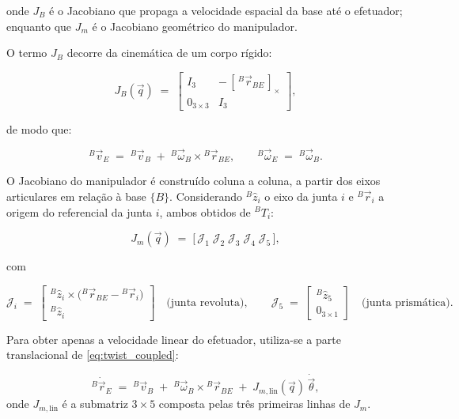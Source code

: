 onde $J_B$ é o Jacobiano que propaga a velocidade espacial da base até o efetuador; enquanto que $J_m$ é o Jacobiano geométrico do manipulador.

O termo $J_B$ decorre da cinemática de um corpo rígido:

\begin{equation}
\label{eq:JB}
J_B(\vec q)
\;=\;
\begin{bmatrix}
I_{3} & -\,[\,{}^{B}\vec r_{BE}\,]_{\times} \\
0_{3\times 3} & I_{3}
\end{bmatrix},
\end{equation}

de modo que:

\begin{equation}
\label{eq:vE_from_vB}
{}^{B}\vec v_E \;=\; {}^{B}\vec v_B \;+\; {}^{B}\vec \omega_B \times {}^{B}\vec r_{BE},
\qquad
{}^{B}\vec \omega_E \;=\; {}^{B}\vec \omega_B.
\end{equation}

O Jacobiano do manipulador é construído coluna a coluna, a partir dos eixos articulares em relação à base $\{B\}$.
Considerando ${}^{B}\hat z_i$ o eixo da junta $i$ e ${}^{B}\vec r_i$ a origem do referencial da junta $i$, ambos obtidos de ${}^{B}T_i$:

\begin{equation}
\label{eq:Jm_colunas}
J_m(\vec q) \;=\; \big[\, \mathcal{J}_1 \;\mathcal{J}_2 \;\mathcal{J}_3 \;\mathcal{J}_4 \;\mathcal{J}_5 \,\big],
\end{equation}

com

\begin{equation}
\label{eq:Jm_rev}
\mathcal{J}_i \;=\;
\begin{bmatrix}
{}^{B}\hat z_i \times \big({}^{B}\vec r_{BE} - {}^{B}\vec r_i\big) \\
{}^{B}\hat z_i
\end{bmatrix}
\quad \text{(junta revoluta)},
\qquad
\mathcal{J}_5 \;=\;
\begin{bmatrix}
{}^{B}\hat z_5 \\
0_{3\times 1}
\end{bmatrix}
\quad \text{(junta prismática)}.
\end{equation}

Para obter apenas a velocidade linear do efetuador, utiliza-se a parte translacional de \eqref{eq:twist_coupled}:

\begin{equation}
\label{eq:linear_relation}
{}^{B}\dot{\vec r}_{E}
\;=\;
{}^{B}\vec v_B
\;+\;
{}^{B}\vec \omega_B \times {}^{B}\vec r_{BE}
\;+\;
J_{m,\text{lin}}(\vec q)\,\dot{\vec\theta},
\end{equation}
onde $J_{m,\text{lin}}$ é a submatriz $3\times 5$ composta pelas três primeiras linhas de $J_m$.


